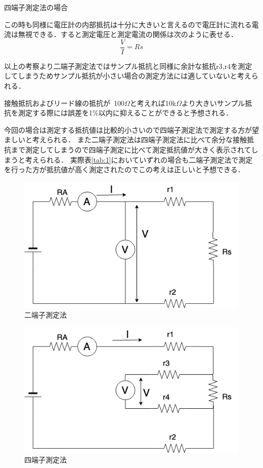 \documentclass[11pt, a4paper,twocolumn]{jarticle}
\begin{document}
\noindent
四端子測定法の場合

この時も同様に電圧計の内部抵抗は十分に大きいと言えるので電圧計に流れる電流は無視できる．すると測定電圧と測定電流の関係は次のように表せる．
\begin{equation}
    \frac{V}{I} = Rs
\end{equation}

以上の考察より二端子測定法ではサンプル抵抗と同様に余計な抵抗r3,r4を測定してしまうためサンプル抵抗が小さい場合の測定方法には適していないと考えられる．

接触抵抗およびリード線の抵抗が~100$\Omega$と考えれば10k$\Omega$より大きいサンプル抵抗を測定する際には誤差を1\%以内に抑えることができると予想される．

今回の場合は測定する抵抗値は比較的小さいので四端子測定法で測定する方が望ましいと考えられる．
また二端子測定法は四端子測定法に比べて余分な接触抵抗まで測定してしまうので四端子測定に比べて測定抵抗値が大きく表示されてしまうと考えられる．
実際表\ref{tab:1}においていずれの場合も二端子測定法で測定を行った方が抵抗値が高く測定されたのでこの考えは正しいと予想できる．


\begin{figure}[htbp]
 \begin{center}
  \includegraphics[width=0.8\linewidth]{fig13.png}
 \end{center}
 \caption{二端子測定法}
 \label{fig:13}
\end{figure}

\begin{figure}[htbp]
 \begin{center}
  \includegraphics[width=0.8\linewidth]{fig14.png}
 \end{center}
 \caption{四端子測定法}
 \label{fig:14}
\end{figure}
\newpage
\end{document}
